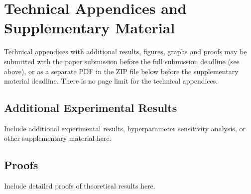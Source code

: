 \documentclass{article}
\begin{document}

\appendix

\section{Technical Appendices and Supplementary Material}
Technical appendices with additional results, figures, graphs and proofs may be submitted with the paper submission before the full submission deadline (see above), or as a separate PDF in the ZIP file below before the supplementary material deadline. There is no page limit for the technical appendices.

\subsection{Additional Experimental Results}

Include additional experimental results, hyperparameter sensitivity analysis, or other supplementary material here.

\subsection{Proofs}

Include detailed proofs of theoretical results here.

\end{document}
